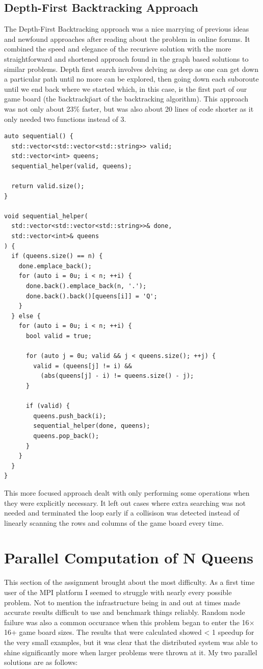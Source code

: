 \documentclass[11pt]{article}
\begin{document}
\subsection{Depth-First Backtracking Approach}
The Depth-First Backtracking approach was a nice marrying of previous ideas and newfound approaches after reading about the problem in online forums. It combined the speed and
elegance of the recurisve solution with the more straightforward and shortened approach found in the graph based solutions to similar problems.
Depth first search involves delving as deep as one can get down a particular path until no more can be explored, then going down each suboroute until we end back where we started which, in this case, is the first part of our game board (the \"backtrack\" part of the backtracking algorithm).
This approach was not only about 23\% faster, but was also about 20 lines of code shorter as it only needed two functions instead of 3.
\lstset{frame=tb,language=c++}
\begin{lstlisting}
auto sequential() {
  std::vector<std::vector<std::string>> valid;
  std::vector<int> queens;
  sequential_helper(valid, queens);

  return valid.size();
}

void sequential_helper(
  std::vector<std::vector<std::string>>& done,
  std::vector<int>& queens
) {
  if (queens.size() == n) {
    done.emplace_back();
    for (auto i = 0u; i < n; ++i) {
      done.back().emplace_back(n, '.');
      done.back().back()[queens[i]] = 'Q';
    }
  } else {
    for (auto i = 0u; i < n; ++i) {
      bool valid = true;

      for (auto j = 0u; valid && j < queens.size(); ++j) {
        valid = (queens[j] != i) &&
          (abs(queens[j] - i) != queens.size() - j);
      }

      if (valid) {
        queens.push_back(i);
        sequential_helper(done, queens);
        queens.pop_back();
      }
    }
  }
}
\end{lstlisting}
This more focused approach dealt with only performing some operations when they were explicitly necessary. It left out cases where extra searching was not needed and terminated the loop early if a collisison was detected instead of linearly scanning the rows and columns of the game board every time.

\section{Parallel Computation of N Queens}
This section of the assignment brought about the most difficulty. As a first time user of the MPI platform I seemed to struggle with nearly every possible problem. Not to mention
the infrastructure being in and out at times made accurate results difficult to use and benchmark things reliably. Random node failure was also a common occurance when this problem began to enter the 16$\times$16+ game board sizes. The results that were calculated showed < 1 speedup for the very small examples, but it was clear that the distributed system was able to shine significantly more when larger problems were thrown at it.
My two parallel solutions are as follows:
\end{document}
